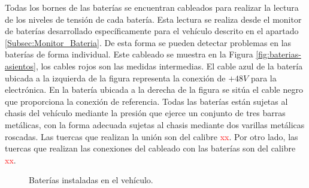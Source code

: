 Todas los bornes de las baterías se encuentran cableados para realizar la lectura de los niveles de tensión de cada batería. Esta lectura se realiza desde el monitor de baterías desarrollado específicamente para el vehículo descrito en el apartado \ref{Subsec:Monitor_Bateria}. De esta forma se pueden detectar problemas en las baterías de forma individual. Este cableado se muestra en la Figura \ref{fig:baterias-asientos}, los cables rojos son las medidas intermedias. El cable azul de la batería ubicada a la izquierda de la figura representa la conexión de $+48V$ para la electrónica. En la batería ubicada a la derecha de la figura se sitúa el cable negro que proporciona la conexión de referencia. Todas las baterías están sujetas al chasis del vehículo mediante la presión que ejerce un conjunto de tres barras metálicas, con la forma adecuada sujetas al chasis mediante dos varillas metálicas roscadas. Las tuercas que realizan la unión son del calibre \textcolor{red}{xx}. Por otro lado, las tuercas que realizan las conexiones del cableado con las baterías son del calibre \textcolor{red}{xx}.

\begin{figure}[!ht]
\begin{center}
	\caption{Baterías instaladas en el vehículo.}
\end{center}
\end{figure}

